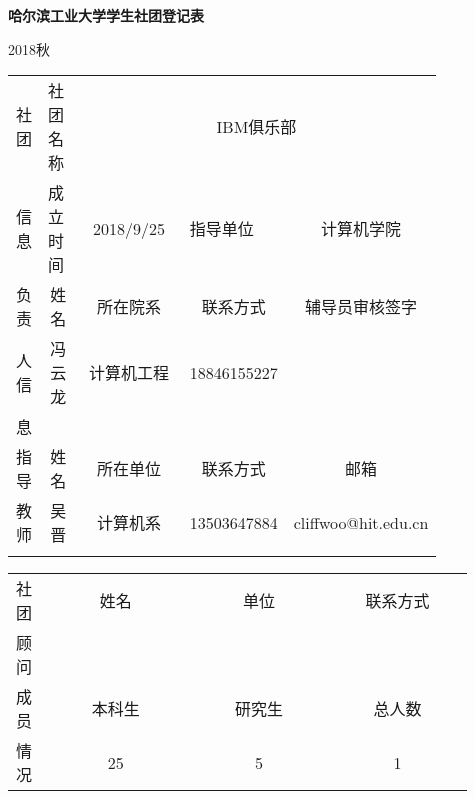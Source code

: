 \documentclass{BaseSetting}
\def\clubname{IBM俱乐部}
\newcommand{\cent}[1]{\multicolumn{1}{c|}{#1}}
\begin{document}
\begin{center}
	\Large \textbf{哈尔滨工业大学学生社团登记表}
\end{center}

\begin{flushright}
	2018秋
\end{flushright}

\begin{table}[H]
	\begin{tabular}{|p{0.05\linewidth}|p{0.1\linewidth}|p{0.3\linewidth}|p{0.1\linewidth}|p{0.3\linewidth}|}
		\hline
		社团 & 社团名称      & \multicolumn{3}{c|}{\clubname}                                                   \\ \cline{2-5}
		信息 & 成立时间      & \cent{2018/9/25}               & 指导单位           & \cent{计算机学院}          \\ \hline
		负责 & \cent{姓名}   & \cent{所在院系}                & \cent{联系方式}    & \cent{辅导员审核签字}      \\ \cline{2-5}
		人信 & \cent{冯云龙} & \cent{计算机工程}              & \cent{18846155227} &                            \\ \cline{2-5}
		息   &               &                                &                    &                            \\ \hline
		指导 & \cent{姓名}   & \cent{所在单位}                & \cent{联系方式}    & \cent{邮箱}                \\ \cline{2-5}
		教师 & \cent{吴晋}   & \cent{计算机系}                & \cent{13503647884} & \cent{cliffwoo@hit.edu.cn} \\ \cline{2-5}
		     &               &                                &                    &                            \\ \hline
	\end{tabular}

	\begin{tabular}{|p{0.05\linewidth}|p{0.3\linewidth}|p{0.28\linewidth}|p{0.28\linewidth}|}
		社团 & \cent{姓名}                                                                                    & \cent{单位}   & \cent{联系方式} \\ \cline{2-4}
		顾问 &                                                                                                &               &                 \\ \hline

		成员 & \cent{本科生}                                                                                  & \cent{研究生} & \cent{总人数}   \\ \cline{2-4}
		情况 & \cent{25}                                                                                      & \cent{5}      & \cent{1}        \\ \hline


\end{tabular}
\end{table}
\end{document}
